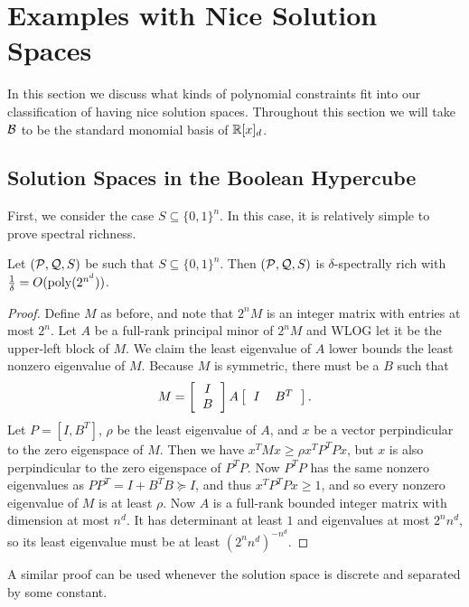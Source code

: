 \section{Examples with Nice Solution Spaces}
\label{sec:nicespaces}
In this section we discuss what kinds of polynomial constraints fit into our classification of having nice solution spaces. Throughout this section we will take $\mathcal B$ to be the standard monomial basis of $\mathbb R[x]_d$. 
\subsection{Solution Spaces in the Boolean Hypercube}
First, we consider the case $S \subseteq \{0,1\}^n$. In this case, it is relatively simple to prove spectral richness.
\begin{lemma}\label{lem:integer-rich}
Let $(\mathcal P, \mathcal Q, S)$ be such that $S \subseteq \{0,1\}^n$. Then $(\mathcal P, \mathcal Q, S)$ is $\delta$-spectrally rich with $\frac{1}{\delta} = O(\operatorname{poly}(2^{n^d}))$.
\end{lemma}
\begin{proof}
Define $M$ as before, and note that $2^nM$ is an integer matrix with entries at most $2^n$. Let $A$ be a full-rank principal minor of $2^nM$ and WLOG let it be the upper-left block of $M$. We claim the least eigenvalue of $A$ lower bounds the least nonzero eigenvalue of $M$. Because $M$ is symmetric, there must be a $B$ such that
\[M = \left[\begin{tabular}{c} $I$ \\ $B$\end{tabular}\right]A\left[\begin{tabular}{cc} $I$ & $B^T$\end{tabular}\right].\]
Let $P = [I, B^T]$, $\rho$ be the least eigenvalue of $A$, and $x$ be a vector perpindicular to the zero eigenspace of $M$. Then we have $x^TMx \geq \rho x^TP^TPx$,
but $x$ is also perpindicular to the zero eigenspace of $P^TP$. Now $P^TP$ has the same nonzero eigenvalues as $PP^T = I + B^TB \succeq I$, and thus $x^TP^TPx \geq 1$, and so every nonzero eigenvalue of $M$ is at least $\rho$. Now $A$ is a full-rank bounded integer matrix with dimension at most $n^d$. It has determinant at least $1$ and eigenvalues at most $2^nn^d$, so its least eigenvalue must be at least $(2^nn^d)^{-n^d}$.
\end{proof}
A similar proof can be used whenever the solution space is discrete and separated by some constant. 

